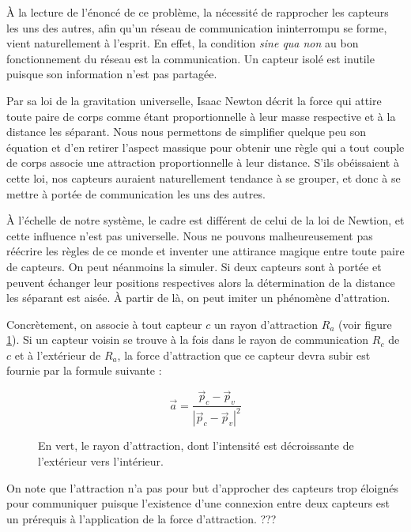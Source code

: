 \documentclass[10pt]{article}
\begin{document}
\begin{multicols}{2}
\`A la lecture de l'énoncé de ce problème, la nécessité de rapprocher
les capteurs les uns des autres, afin qu'un réseau de communication
ininterrompu se forme, vient naturellement à l'esprit. En effet, la
condition \textit{sine qua non} au bon fonctionnement du réseau est la
communication. Un capteur isolé est inutile puisque son
information n'est pas partagée.

Par sa loi de la gravitation universelle, Isaac Newton décrit la force
qui attire toute paire de corps comme étant proportionnelle à leur
masse respective et à la distance les séparant. Nous nous permettons
de simplifier quelque peu son équation et d'en retirer l'aspect
massique pour obtenir une règle qui a tout couple de corps associe une
attraction proportionnelle à leur distance. S'ils obéissaient à cette
loi, nos capteurs auraient naturellement tendance à se grouper, et
donc à se mettre à portée de communication les uns des autres.

\`A l'échelle de notre système, le cadre est différent de celui de la
loi de Newtion, et cette influence n'est pas universelle. Nous ne
pouvons malheureusement pas réécrire les règles de ce monde et
inventer une attirance magique entre toute paire de capteurs. On peut
néanmoins la simuler. Si deux capteurs sont à portée et peuvent
échanger leur positions respectives alors la détermination de la
distance les séparant est aisée. \`A partir de là, on peut imiter un
phénomène d'attration.

Concrètement, on associe à tout capteur $c$ un rayon d'attraction
$R_a$ (voir figure \ref{attraction}). Si un capteur voisin se trouve à
la fois dans le rayon de communication $R_c$ de $c$ et à l'extérieur
de $R_a$, la force d'attraction que ce capteur devra subir est fournie
par la formule suivante :

$$
\vec{a} = \frac{\vec{p}_c - \vec{p}_v}{|\vec{p}_c - \vec{p}_v|^2}
$$

\begin{figure}[H]

  \centering

  

  \caption{En vert, le rayon d'attraction, dont l'intensité est
    décroissante de l'extérieur vers l'intérieur.}
  \label{attraction}

\end{figure}

On note que l'attraction n'a pas pour but d'approcher des capteurs
trop éloignés pour communiquer puisque l'existence d'une connexion
entre deux capteurs est un prérequis à l'application de la force
d'attraction. ???


\end{multicols}
\end{document}
